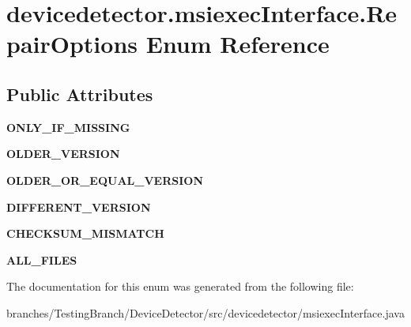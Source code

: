 \hypertarget{enumdevicedetector_1_1msiexecInterface_1_1RepairOptions}{\section{devicedetector.\-msiexec\-Interface.\-Repair\-Options Enum Reference}
\label{enumdevicedetector_1_1msiexecInterface_1_1RepairOptions}
}
\subsection*{Public Attributes}
\begin{DoxyCompactItemize}
\item 
\hypertarget{enumdevicedetector_1_1msiexecInterface_1_1RepairOptions_a1ae6276c993b0e971300c0152a4811e0}{{\bfseries O\-N\-L\-Y\-\_\-\-I\-F\-\_\-\-M\-I\-S\-S\-I\-N\-G}}\label{enumdevicedetector_1_1msiexecInterface_1_1RepairOptions_a1ae6276c993b0e971300c0152a4811e0}

\item 
\hypertarget{enumdevicedetector_1_1msiexecInterface_1_1RepairOptions_ab04b34fbec3a1591235637df36c6972f}{{\bfseries O\-L\-D\-E\-R\-\_\-\-V\-E\-R\-S\-I\-O\-N}}\label{enumdevicedetector_1_1msiexecInterface_1_1RepairOptions_ab04b34fbec3a1591235637df36c6972f}

\item 
\hypertarget{enumdevicedetector_1_1msiexecInterface_1_1RepairOptions_a90d0d93089b7d50b4014d949323dd190}{{\bfseries O\-L\-D\-E\-R\-\_\-\-O\-R\-\_\-\-E\-Q\-U\-A\-L\-\_\-\-V\-E\-R\-S\-I\-O\-N}}\label{enumdevicedetector_1_1msiexecInterface_1_1RepairOptions_a90d0d93089b7d50b4014d949323dd190}

\item 
\hypertarget{enumdevicedetector_1_1msiexecInterface_1_1RepairOptions_aca9db5789f57d3fee0adc50f4ab3d9bb}{{\bfseries D\-I\-F\-F\-E\-R\-E\-N\-T\-\_\-\-V\-E\-R\-S\-I\-O\-N}}\label{enumdevicedetector_1_1msiexecInterface_1_1RepairOptions_aca9db5789f57d3fee0adc50f4ab3d9bb}

\item 
\hypertarget{enumdevicedetector_1_1msiexecInterface_1_1RepairOptions_a871cd3c5159fa108d09d035bd5d7b209}{{\bfseries C\-H\-E\-C\-K\-S\-U\-M\-\_\-\-M\-I\-S\-M\-A\-T\-C\-H}}\label{enumdevicedetector_1_1msiexecInterface_1_1RepairOptions_a871cd3c5159fa108d09d035bd5d7b209}

\item 
\hypertarget{enumdevicedetector_1_1msiexecInterface_1_1RepairOptions_ad943a0dda875bd7ad0379d05112da39d}{{\bfseries A\-L\-L\-\_\-\-F\-I\-L\-E\-S}}\label{enumdevicedetector_1_1msiexecInterface_1_1RepairOptions_ad943a0dda875bd7ad0379d05112da39d}

\end{DoxyCompactItemize}


The documentation for this enum was generated from the following file\-:\begin{DoxyCompactItemize}
\item 
branches/\-Testing\-Branch/\-Device\-Detector/src/devicedetector/msiexec\-Interface.\-java\end{DoxyCompactItemize}
